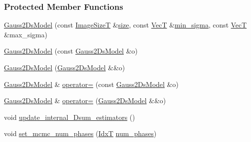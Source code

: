 \subsubsection*{Protected Member Functions}
\begin{DoxyCompactItemize}
\item 
\hyperlink{classmappel_1_1Gauss2DsModel_ab884d4d8ab54ec53cf0116aa9a5b1d81}{Gauss2\+Ds\+Model} (const \hyperlink{classmappel_1_1ImageFormat2DBase_a49cccf61eb2a768a202634d27fcd81d5}{Image\+SizeT} \&\hyperlink{classmappel_1_1ImageFormat2DBase_a3be77d2aa6ec9f3815322732950c2a60}{size}, const \hyperlink{namespacemappel_a2225ad69f358daa3f4f99282a35b9a3a}{VecT} \&\hyperlink{classmappel_1_1Gauss2DsModel_a8a97d37d210c1d161e4bc32c3a7b20dc}{min\+\_\+sigma}, const \hyperlink{namespacemappel_a2225ad69f358daa3f4f99282a35b9a3a}{VecT} \&max\+\_\+sigma)
\item 
\hyperlink{classmappel_1_1Gauss2DsModel_a1fdc8bb02f6432d4222ce3c1082b8a49}{Gauss2\+Ds\+Model} (const \hyperlink{classmappel_1_1Gauss2DsModel}{Gauss2\+Ds\+Model} \&o)
\item 
\hyperlink{classmappel_1_1Gauss2DsModel_afa119091b52bf52af2684c14bee2e74d}{Gauss2\+Ds\+Model} (\hyperlink{classmappel_1_1Gauss2DsModel}{Gauss2\+Ds\+Model} \&\&o)
\item 
\hyperlink{classmappel_1_1Gauss2DsModel}{Gauss2\+Ds\+Model} \& \hyperlink{classmappel_1_1Gauss2DsModel_ab1b09eccafc20261b34a404fc8dede4e}{operator=} (const \hyperlink{classmappel_1_1Gauss2DsModel}{Gauss2\+Ds\+Model} \&o)
\item 
\hyperlink{classmappel_1_1Gauss2DsModel}{Gauss2\+Ds\+Model} \& \hyperlink{classmappel_1_1Gauss2DsModel_a5b348e1cd39b6eed7269285f67f32820}{operator=} (\hyperlink{classmappel_1_1Gauss2DsModel}{Gauss2\+Ds\+Model} \&\&o)
\item 
void \hyperlink{classmappel_1_1Gauss2DsModel_a6ce7054c0fcdb72394839a0abb2616cb}{update\+\_\+internal\+\_\+Dsum\+\_\+estimators} ()
\item 
void \hyperlink{classmappel_1_1MCMCAdaptorBase_ad6c75e327e8732abc2654492f372563a}{set\+\_\+mcmc\+\_\+num\+\_\+phases} (\hyperlink{namespacemappel_ab17ec0f30b61ece292439d7ece81d3a8}{IdxT} \hyperlink{classmappel_1_1MCMCAdaptorBase_a44b90a984ace712584074dc17831fe25}{num\+\_\+phases})
\end{DoxyCompactItemize}
